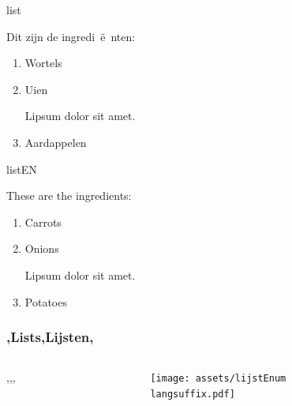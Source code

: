 \copyrightVincent


    \begin{saveblock}{list}
        \begin{highlightblock}[linewidth=0.5\textwidth,gobble=8]
            Dit zijn de ingredi~\"e~nten:
            \begin{enumerate}
                \item Wortels
                \item Uien
                
                Lipsum dolor sit amet.
                \item Aardappelen
            \end{enumerate}
        \end{highlightblock}
    \end{saveblock}

    \begin{saveblock}{listEN}
        \begin{highlightblock}[linewidth=0.5\textwidth,gobble=8]
            These are the ingredients:
            \begin{enumerate}
                \item Carrots
                \item Onions
                
                Lipsum dolor sit amet.
                \item Potatoes
            \end{enumerate}
        \end{highlightblock}
    \end{saveblock}

    \begin{frame}
        \frametitle{\lang,Lists,Lijsten,}
        
        \begin{columns}
            \begin{column}{0.5\textwidth}
                \lang,,,
            \end{column}
            \begin{column}{0.5\textwidth}
                    
                \texttt{[image: assets/lijstEnum\\langsuffix.pdf]}
            \end{column}
        \end{columns}
    \end{frame}

